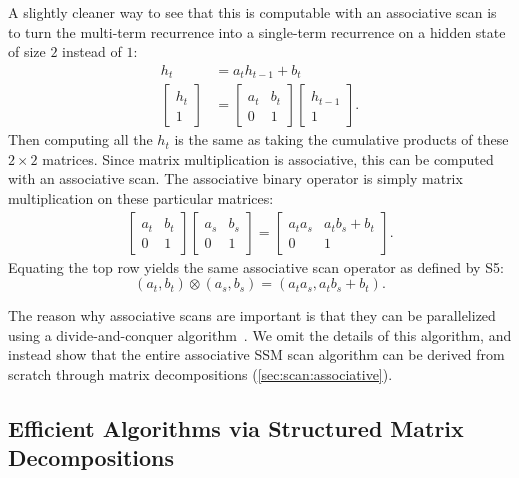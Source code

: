 A slightly cleaner way to see that this is computable with an associative scan is to turn the multi-term recurrence into a single-term recurrence on a hidden state of size $2$ instead of $1$:
\begin{align*}%
  h_t &= a_t h_{t-1} + b_t
  \\
  \begin{bmatrix} h_t \\ 1 \end{bmatrix}
      &=
  \begin{bmatrix}
    a_t & b_t \\ 0 & 1
  \end{bmatrix}
  \begin{bmatrix} h_{t-1} \\ 1 \end{bmatrix}
  .
\end{align*}
Then computing all the $h_t$ is the same as taking the cumulative products of these $2 \times 2$ matrices.
Since matrix multiplication is associative,
this can be computed with an associative scan.
The associative binary operator is simply matrix multiplication on these particular matrices:
\begin{align*}%
  \begin{bmatrix}
    a_t & b_t \\ 0 & 1
  \end{bmatrix}
  \begin{bmatrix}
    a_s & b_s \\ 0 & 1
  \end{bmatrix}
  =
  \begin{bmatrix}
    a_ta_s & a_tb_s + b_t \\ 0 & 1
  \end{bmatrix}
  .
\end{align*}
Equating the top row yields the same associative scan operator as defined by S5:
\begin{equation}%
  \label{eq:scan:associative-operator}
  (a_t, b_t) \otimes (a_s, b_s) = (a_ta_s, a_tb_s + b_t)
  .
\end{equation}

The reason why associative scans are important is that they can be parallelized using a divide-and-conquer algorithm~\citep{blelloch1990prefix}.
We omit the details of this algorithm, and instead show that the entire associative SSM scan algorithm can be derived from scratch through matrix decompositions (\cref{sec:scan:associative}).

\subsection{Efficient Algorithms via Structured Matrix Decompositions}

